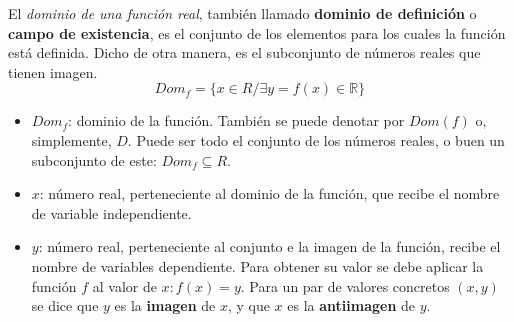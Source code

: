 
\begin{definition}
	El \emph{dominio de una función real}, también llamado \textbf{dominio de definición} o \textbf{campo de existencia}, es el conjunto de los elementos para los cuales la función está definida. Dicho de otra manera, es el subconjunto de números reales que tienen imagen.
	$$Dom_{f} =\{x \in R / \exists y = f(x) \in \mathbb{R}\}$$
\end{definition}
\begin{itemize} 
	\item $Dom_{f}$: dominio de la función. También se puede denotar por $Dom(f)$ o, simplemente, $D$. Puede ser todo el conjunto de los números reales, o buen un subconjunto de este: $Dom_{f} \subseteq R$. 
	\item $x$: número real, perteneciente al dominio de la función, que recibe el nombre de variable independiente. 
	\item $y$: número real, perteneciente al conjunto e la imagen de la función, recibe el nombre de variables dependiente. Para obtener su valor se debe aplicar la función $f$ al valor de $x: f(x)=y$. Para un par de valores concretos $(x,y)$ se dice que $y$ es la \textbf{imagen} de $x$, y que $x$ es la \textbf{antiimagen} de $y$.
\end{itemize} 
